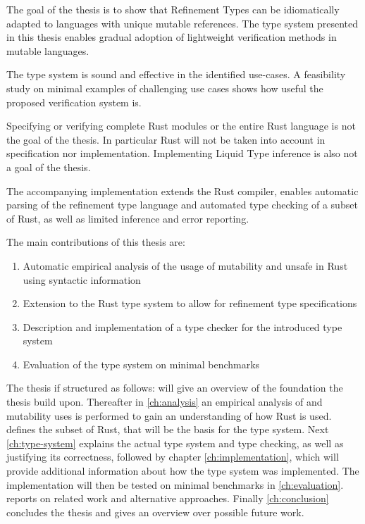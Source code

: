 \documentclass[twoside, english]{sdqthesis}
\theoremstyle{definition}
\begin{document}
The goal of the thesis is to show that Refinement Types can be idiomatically adapted to languages with unique mutable references. The type system presented in this thesis enables gradual adoption of lightweight verification methods in mutable languages.

The type system is sound and effective in the identified use-cases.
A feasibility study on minimal examples of challenging use cases shows how useful the proposed verification system is. 

Specifying or verifying complete Rust modules or the entire Rust language is not the goal of the thesis. In particular  Rust will not be taken into account in specification nor implementation. Implementing Liquid Type inference is also not a goal of the thesis.

The accompanying implementation extends the Rust compiler, enables automatic parsing of the refinement type language and automated type checking of a subset of Rust, as well as limited inference and error reporting. 

The main contributions of this thesis are:
\begin{enumerate}
  \item Automatic empirical analysis of the usage of mutability and unsafe in Rust using syntactic information
  \item Extension to the Rust type system to allow for refinement type specifications
  \item Description and implementation of a type checker for the introduced type system
  \item Evaluation of the type system on minimal benchmarks
\end{enumerate}

The thesis if structured as follows: 
 will give an overview of the foundation the thesis build upon.
Thereafter in \cref{ch:analysis} an empirical analysis of  and mutability uses is performed to gain an understanding of how Rust is used.
 defines the subset of Rust, that will be the basis for the type system.
Next \cref{ch:type-system} explains the actual type system and type checking, as well as justifying its correctness, followed by chapter \cref{ch:implementation}, which will provide additional information about how the type system was implemented.
The implementation will then be tested on minimal benchmarks in \cref{ch:evaluation}.
 reports on related work and alternative approaches.
Finally \cref{ch:conclusion} concludes the thesis and gives an overview over possible future work.
\end{document}
